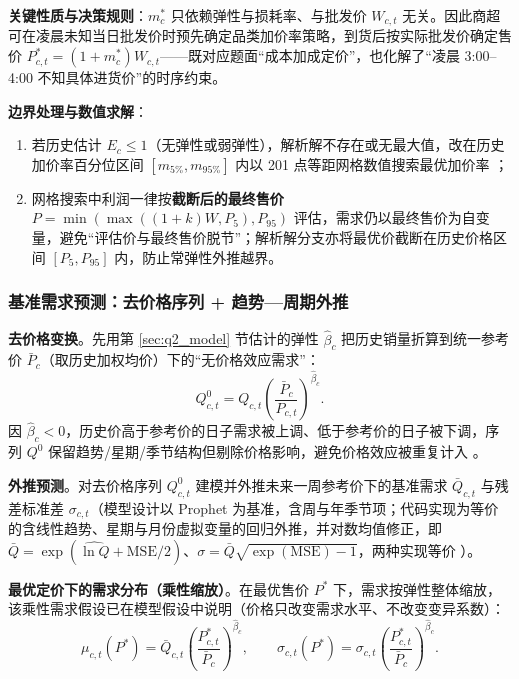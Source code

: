 \textbf{关键性质与决策规则}：$m^*_c$ 只依赖弹性与损耗率、与批发价 $W_{c,t}$ 无关。因此商超可在凌晨未知当日批发价时预先确定品类加价率策略，到货后按实际批发价确定售价 $P^*_{c,t}=(1+m^*_c)W_{c,t}$——既对应题面“成本加成定价”，也化解了“凌晨 3:00–4:00 不知具体进货价”的时序约束。

\textbf{边界处理与数值求解}：

\begin{enumerate}
\item 若历史估计 $E_c\le 1$（无弹性或弱弹性），解析解不存在或无最大值，改在历史加价率百分位区间 $[m_{5\%},m_{95\%}]$ 内以 201 点等距网格数值搜索最优加价率 \cite{tellis1988}；
\item 网格搜索中利润一律按\textbf{截断后的最终售价} $P=\min(\max((1+k)W,P_5),P_{95})$ 评估，需求仍以最终售价为自变量，避免“评估价与最终售价脱节”；解析解分支亦将最优价截断在历史价格区间 $[P_5,P_{95}]$ 内，防止常弹性外推越界。
\end{enumerate}

\subsubsection{基准需求预测：去价格序列 + 趋势—周期外推}

\textbf{去价格变换}。先用第 \ref{sec:q2_model} 节估计的弹性 $\hat\beta_c$ 把历史销量折算到统一参考价 $\bar P_c$（取历史加权均价）下的“无价格效应需求”：
\begin{equation}
Q^0_{c,t}=Q_{c,t}\left(\frac{\bar P_c}{P_{c,t}}\right)^{\hat\beta_c}.
\end{equation}
因 $\hat\beta_c<0$，历史价高于参考价的日子需求被上调、低于参考价的日子被下调，序列 $Q^0$ 保留趋势/星期/季节结构但剔除价格影响，避免价格效应被重复计入 \cite{taylor2018,hyndman2018}。

\textbf{外推预测}。对去价格序列 $Q^0_{c,t}$ 建模并外推未来一周参考价下的基准需求 $\bar Q_{c,t}$ 与残差标准差 $\sigma_{c,t}$（模型设计以 Prophet 为基准，含周与年季节项；代码实现为等价的含线性趋势、星期与月份虚拟变量的回归外推，并对数均值修正，即 $\bar Q=\exp(\widehat{\ln Q}+\mathrm{MSE}/2)$、$\sigma=\bar Q\sqrt{\exp(\mathrm{MSE})-1}$，两种实现等价 \cite{taylor2018,hyndman2018}）。

\textbf{最优定价下的需求分布（乘性缩放）}。在最优售价 $P^*$ 下，需求按弹性整体缩放，该乘性需求假设已在模型假设中说明（价格只改变需求水平、不改变变异系数）\cite{petruzzi1999}：
\begin{equation}
\mu_{c,t}(P^*)=\bar Q_{c,t}\left(\frac{P^*_{c,t}}{\bar P_c}\right)^{\hat\beta_c},\qquad \sigma_{c,t}(P^*)=\sigma_{c,t}\left(\frac{P^*_{c,t}}{\bar P_c}\right)^{\hat\beta_c}.
\end{equation}

